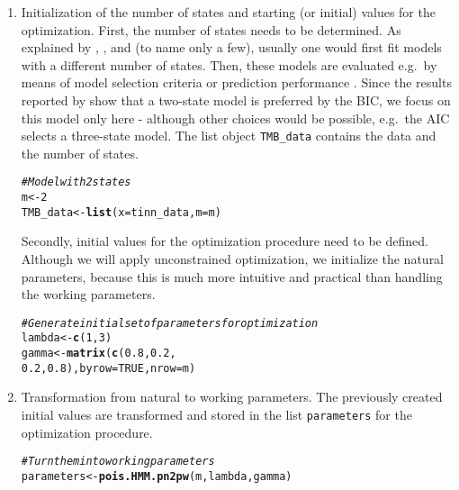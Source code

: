 \documentclass[bimj,fleqn]{w-art}\usepackage[]{graphicx}\usepackage[]{color}
\makeatletter
\newcommand{\hlnum}[1]{\textcolor[rgb]{0.686,0.059,0.569}{#1}}%
\newcommand{\hlcom}[1]{\textcolor[rgb]{0.678,0.584,0.686}{\textit{#1}}}%
\newcommand{\hlstd}[1]{\textcolor[rgb]{0.345,0.345,0.345}{#1}}%
\newcommand{\hlkwb}[1]{\textcolor[rgb]{0.69,0.353,0.396}{#1}}%
\newcommand{\hlkwc}[1]{\textcolor[rgb]{0.333,0.667,0.333}{#1}}%
\newcommand{\hlkwd}[1]{\textcolor[rgb]{0.737,0.353,0.396}{\textbf{#1}}}%
\newenvironment{kframe}{%
 \def\at@end@of@kframe{}%
 \ifinner\ifhmode%
  \def\at@end@of@kframe{\end{minipage}}%
  \begin{minipage}{\columnwidth}%
 \fi\fi%
 \def\FrameCommand##1{\hskip\@totalleftmargin \hskip-\fboxsep
 \colorbox{shadecolor}{##1}\hskip-\fboxsep
     \hskip-\linewidth \hskip-\@totalleftmargin \hskip\columnwidth}%
 \MakeFramed {\advance\hsize-\width
   \@totalleftmargin\z@ \linewidth\hsize
   \@setminipage}}%
 {\par\unskip\endMakeFramed%
 \at@end@of@kframe}
\newenvironment{knitrout}{}{} %
\theoremstyle{plain}
\theoremstyle{definition}
\makeatother
\begin{document}
\begin{enumerate}
\item Initialization of the number of states and starting (or initial) values for the optimization. First, the number of states needs to be determined. As explained by \citet{pohlea}, \citet{pohle}, and \citet[][Section 6]{zucchini} (to name only a few), usually one would first fit models with a different number of states. Then, these models are evaluated e.g.~by means of model selection criteria \citep[as carried out by][]{leroux} or prediction performance \citep{celeux}. Since the results reported by \citet{leroux} show that a two-state model is preferred by the BIC, we focus on this model only here - although other choices would be possible, e.g.~the AIC selects a three-state model. The list object \texttt{TMB\_data} contains the data and the number of states.
\begin{knitrout}
\color{fgcolor}\begin{kframe}
\begin{alltt}
\hlcom{# Model with 2 states}
\hlstd{m} \hlkwb{<-} \hlnum{2}
\hlstd{TMB_data} \hlkwb{<-} \hlkwd{list}\hlstd{(}\hlkwc{x} \hlstd{= tinn_data,} \hlkwc{m} \hlstd{= m)}
\end{alltt}
\end{kframe}
\end{knitrout}
Secondly, initial values for the optimization procedure need to be defined. Although we will apply unconstrained optimization, we initialize the natural parameters, because this is much more intuitive and practical than handling the working parameters. 
\begin{knitrout}
\color{fgcolor}\begin{kframe}
\begin{alltt}
\hlcom{# Generate initial set of parameters for optimization}
\hlstd{lambda} \hlkwb{<-} \hlkwd{c}\hlstd{(}\hlnum{1}\hlstd{,} \hlnum{3}\hlstd{)}
\hlstd{gamma} \hlkwb{<-} \hlkwd{matrix}\hlstd{(}\hlkwd{c}\hlstd{(}\hlnum{0.8}\hlstd{,} \hlnum{0.2}\hlstd{,}
                  \hlnum{0.2}\hlstd{,} \hlnum{0.8}\hlstd{),} \hlkwc{byrow} \hlstd{=} \hlnum{TRUE}\hlstd{,} \hlkwc{nrow} \hlstd{= m)}
\end{alltt}
\end{kframe}
\end{knitrout}

\item Transformation from natural to working parameters. The previously created initial values are transformed and stored in the list {\tt parameters} for the optimization procedure.
\begin{knitrout}
\color{fgcolor}\begin{kframe}
\begin{alltt}
\hlcom{# Turn them into working parameters}
\hlstd{parameters} \hlkwb{<-} \hlkwd{pois.HMM.pn2pw}\hlstd{(m, lambda, gamma)}
\end{alltt}
\end{kframe}
\end{knitrout}


\end{enumerate}
\end{document}
